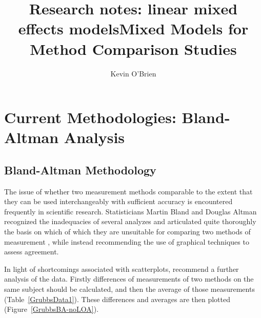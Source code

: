 \documentclass[12pt, a4paper]{report}
\title{Research notes: linear mixed effects models}
\author{ } \date{ }
\theoremstyle{plain}
\theoremstyle{definition}
\theoremstyle{remark}
\begin{document}
	\author{Kevin O'Brien}
	\title{Mixed Models for Method Comparison Studies}
	\tableofcontents
	
	\newpage
	\chapter{Current Methodologies: Bland-Altman Analysis}
	\section{Bland-Altman Methodology}
	
	The issue of whether two measurement methods comparable to the 	extent that they can be used interchangeably with sufficient accuracy is encountered frequently in scientific research. Statisticians Martin Bland and Douglas Altman recognized the inadequacies of several analyzes and articulated quite thoroughly the basis on which of which they are unsuitable for comparing two methods of measurement \citep*{BA83}, while instead recommending the use of graphical techniques to assess agreement.

In light of shortcomings associated with scatterplots, \citet*{BA83} recommend a further analysis of the data. Firstly
differences of measurements of two methods on the same subject should  be calculated, and then the average of those measurements
(Table~\ref{GrubbsData1}). These differences and averages are then plotted (Figure~\ref{GrubbsBA-noLOA}).

		
\end{document}
